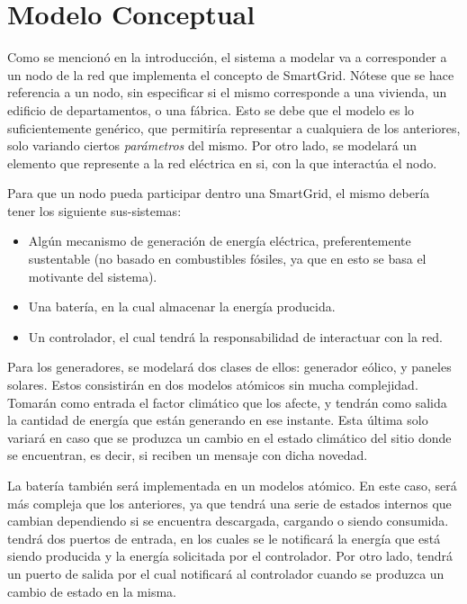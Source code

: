 \section{Modelo Conceptual}

Como se mencionó en la introducción, el sistema a modelar va a corresponder a
un nodo de la red que implementa el concepto de SmartGrid. Nótese que se hace
referencia a un nodo, sin especificar si el mismo corresponde a una vivienda,
un edificio de departamentos, o una fábrica. Esto se debe que el modelo es lo
suficientemente genérico, que permitiría representar a cualquiera de los
anteriores, solo variando ciertos \textit{parámetros} del mismo. Por otro
lado, se modelará un elemento que represente a la red eléctrica en si, con la
que interactúa el nodo.

Para que un nodo pueda participar dentro una SmartGrid, el mismo debería
tener los siguiente sus-sistemas:
\begin{itemize}
    \item Algún mecanismo de generación de energía eléctrica, preferentemente
    sustentable (no basado en combustibles fósiles, ya que en esto se basa el
    motivante del sistema).
    \item Una batería, en la cual almacenar la energía producida.
    \item Un controlador, el cual tendrá la responsabilidad de interactuar con la red.
\end{itemize}

Para los generadores, se modelará dos clases de ellos: generador eólico, y
paneles solares. Estos consistirán en dos modelos atómicos sin mucha
complejidad. Tomarán como entrada el factor climático que los afecte, y
tendrán como salida la cantidad de energía que están generando en ese
instante. Esta última solo variará en caso que se produzca un cambio en el
estado climático del sitio donde se encuentran, es decir, si reciben un
mensaje con dicha novedad.

La batería también será implementada en un modelos atómico. En este caso,
será más compleja que los anteriores, ya que tendrá una serie de estados
internos que cambian dependiendo si se encuentra descargada, cargando o
siendo consumida. tendrá dos puertos de entrada, en los cuales se le
notificará la energía que está siendo producida y la energía solicitada por
el controlador. Por otro lado, tendrá un puerto de salida por el cual
notificará al controlador cuando se produzca un cambio de estado en la misma.

